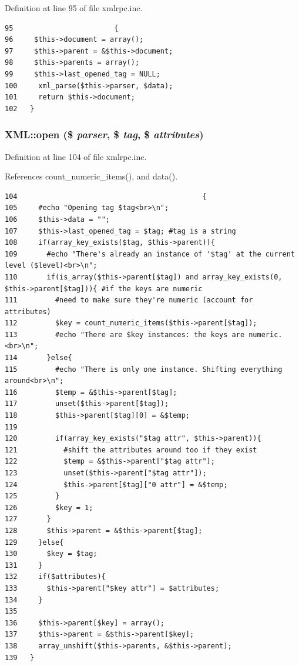 Definition at line 95 of file xmlrpc.inc.

\begin{Code}\begin{verbatim}95                        {
96     $this->document = array();
97     $this->parent = &$this->document;
98     $this->parents = array();
99     $this->last_opened_tag = NULL;
100     xml_parse($this->parser, $data);
101     return $this->document;
102   }
\end{verbatim}
\end{Code}


\hypertarget{classXML_eac7eae74d866d4f5a0cdb9be27ff279}{
\subsubsection{\setlength{\rightskip}{0pt plus 5cm}XML::open (\$ {\em parser}, \$ {\em tag}, \$ {\em attributes})}}
\label{classXML_eac7eae74d866d4f5a0cdb9be27ff279}




Definition at line 104 of file xmlrpc.inc.

References count\_\-numeric\_\-items(), and data().

\begin{Code}\begin{verbatim}104                                            {
105     #echo "Opening tag $tag<br>\n";
106     $this->data = "";
107     $this->last_opened_tag = $tag; #tag is a string
108     if(array_key_exists($tag, $this->parent)){
109       #echo "There's already an instance of '$tag' at the current level ($level)<br>\n";
110       if(is_array($this->parent[$tag]) and array_key_exists(0, $this->parent[$tag])){ #if the keys are numeric
111         #need to make sure they're numeric (account for attributes)
112         $key = count_numeric_items($this->parent[$tag]);
113         #echo "There are $key instances: the keys are numeric.<br>\n";
114       }else{
115         #echo "There is only one instance. Shifting everything around<br>\n";
116         $temp = &$this->parent[$tag];
117         unset($this->parent[$tag]);
118         $this->parent[$tag][0] = &$temp;
119 
120         if(array_key_exists("$tag attr", $this->parent)){
121           #shift the attributes around too if they exist
122           $temp = &$this->parent["$tag attr"];
123           unset($this->parent["$tag attr"]);
124           $this->parent[$tag]["0 attr"] = &$temp;
125         }
126         $key = 1;
127       }
128       $this->parent = &$this->parent[$tag];
129     }else{
130       $key = $tag;
131     }
132     if($attributes){
133       $this->parent["$key attr"] = $attributes;
134     }
135 
136     $this->parent[$key] = array();
137     $this->parent = &$this->parent[$key];
138     array_unshift($this->parents, &$this->parent);
139   }
\end{verbatim}
\end{Code}




